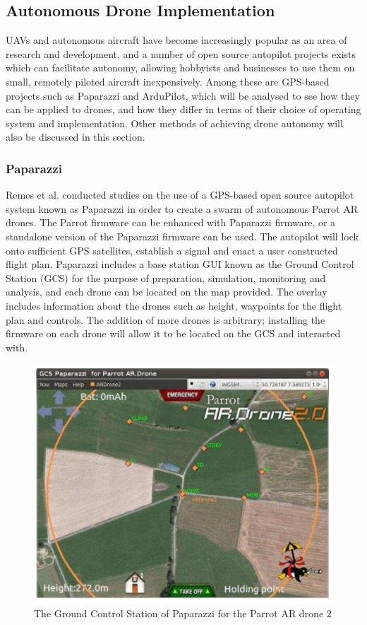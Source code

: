 \subsection{Autonomous Drone Implementation}
UAVs and autonomous aircraft have become increasingly popular as an area of research and development, and a number of open source autopilot projects exists which can facilitate autonomy, allowing hobbyists and businesses to use them on small, remotely piloted aircraft inexpensively. Among these are GPS-based projects such as Paparazzi and ArduPilot, which will be analysed to see how they can be applied to drones, and how they differ in terms of their choice of operating system and implementation. Other methods of achieving drone autonomy will also be discussed in this section.

\subsubsection{Paparazzi}
Remes et al. \cite{bartremes13} conducted studies on the use of a GPS-based open source autopilot system known as Paparazzi in order to create a swarm of autonomous Parrot AR drones. The Parrot firmware can be enhanced with Paparazzi firmware, or a standalone version of the Paparazzi firmware can be used. The autopilot will lock onto sufficient GPS satellites, establish a signal and enact a user constructed flight plan.
Paparazzi includes a base station GUI known as the Ground Control Station (GCS) for the purpose of preparation, simulation, monitoring and analysis, and each drone can be located on the map provided.  The overlay includes information about the drones such as height, waypoints for the flight plan and controls. The addition of more drones is arbitrary; installing the firmware on each drone will allow it to be located on the GCS and interacted with. 

\begin{figure}
\centering	
\includegraphics[scale=0.4]{img/papgcs}	
\caption{The Ground Control Station of Paparazzi for the Parrot AR drone 2}
\end{figure}

